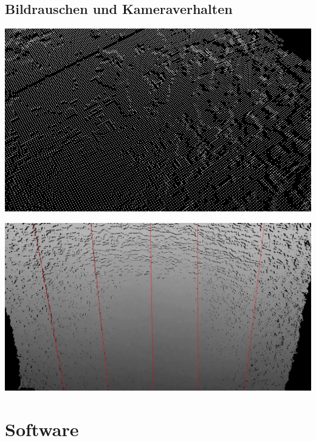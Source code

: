 \documentclass{VLKlauck}
\begin{document}
	
	\subsection{Bildrauschen und Kameraverhalten}
	\begin{frame}{\insertsubsection}	
	    \includegraphics[scale=0.5]{noise.png}
	\end{frame}
	
	\begin{frame}{\insertsubsection}	
		\includegraphics[scale=0.3]{verticalFractals.png}
	\end{frame}	
	
	
	\section{Software}  
\end{document}
